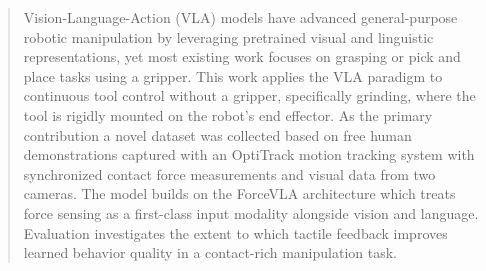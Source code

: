 \documentclass[times, utf8, diplomski]{fer}
\begin{document}
\begin{abstract}
Vision-Language-Action (VLA) models have advanced general-purpose robotic manipulation by leveraging pretrained visual and linguistic representations, yet most existing work focuses on grasping or pick and place tasks using a gripper. This work applies the VLA paradigm to continuous tool control without a gripper, specifically grinding, where the tool is rigidly mounted on the robot's end effector. As the primary contribution a novel dataset was collected based on free human demonstrations captured with an OptiTrack motion tracking system with synchronized contact force measurements and visual data from two cameras. The model builds on the ForceVLA architecture which treats force sensing as a first-class input modality alongside vision and language. Evaluation investigates the extent to which tactile feedback improves learned behavior quality in a contact-rich manipulation task.

\end{abstract}
\end{document}
